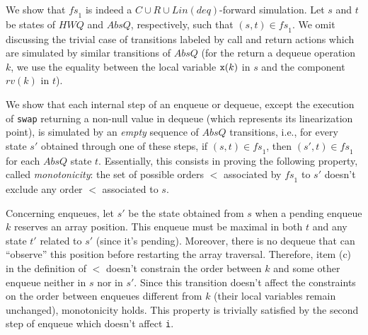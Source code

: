We show that $\mathit{fs}_1$ is indeed a $C\cup R\cup Lin(deq)$-forward simulation. Let $s$ and $t$ be states of $\mathit{HWQ}$ and $AbsQ$, respectively, such that $(s,t)\in\mathit{fs}_1$. 
We omit discussing the trivial case of transitions labeled by call and return actions which are simulated by similar transitions of $AbsQ$ (for the return a dequeue operation $k$, we use the equality between the local variable ${\tt x}(k)$ in $s$ and the component $rv(k)$ in $t$). 



We show that each internal step of an enqueue or dequeue, except the execution of {\tt swap} returning a non-null value in dequeue (which represents its linearization point), is simulated by an \emph{empty} sequence of $AbsQ$ transitions, i.e., for every state $s'$ obtained through one of these steps, if $(s,t)\in\mathit{fs}_1$, then $(s',t)\in\mathit{fs}_1$ for each $AbsQ$ state $t$. 
Essentially, this consists in proving the following property, called \emph{monotonicity}: the set of possible orders $<$ associated by $\mathit{fs}_1$ to $s'$ doesn't exclude any order $<$ associated to $s$.

Concerning enqueues, let $s'$ be the state obtained from $s$ when a pending enqueue $k$ reserves an array position. This enqueue must be maximal in both $t$ and any state $t'$ related to $s'$ (since it's pending). Moreover, there is no dequeue that can ``observe'' this position before restarting the array traversal. Therefore, item (c) in the definition of $<$ doesn't constrain the order between $k$ and some other enqueue neither in $s$ nor in $s'$. Since this transition doesn't affect the constraints on the order between enqueues different from $k$ (their local variables remain unchanged), monotonicity holds. This property is trivially satisfied by the second step of enqueue which doesn't affect {\tt i}.

